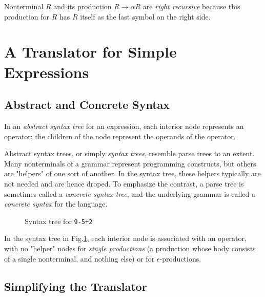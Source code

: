 \documentclass[a4paper,twoside]{book}
\begin{document}
Nonterminal $R$ and its production $R\to\alpha R$ are \textit{right recursive} because this production for $R$ has $R$ itself as the last symbol on the right side.

\section{A Translator for Simple Expressions}

\subsection{Abstract and Concrete Syntax}

In an \textit{abstract syntax tree} for an expression, each interior node represents an operator; the children of the node represent the operands of the operator.

Abstract syntax trees, or simply \textit{syntax trees}, resemble parse trees to an extent. Many nonterminals of a grammar represent programming constructs, but others are "helpers" of one sort of another. In the syntax tree, these helpers typically are not needed and are hence droped. To emphasize the contrast, a parse tree is sometimes called a \textit{concrete syntax tree}, and the underlying grammar is called a \textit{concrete syntax} for the language.

\begin{figure}[htbp]
    \centering
    \caption{Syntax tree for \texttt{9-5+2}}
    \label{Figure:2.22}
\end{figure}

In the syntax tree in Fig.\;\ref{Figure:2.22}, each interior node is associated with an operator, with no "helper" nodes for \textit{single productions} (a production whose body consists of a single nonterminal, and nothing else) or for $\epsilon$-productions.

\subsection{Simplifying the Translator}
\end{document}
